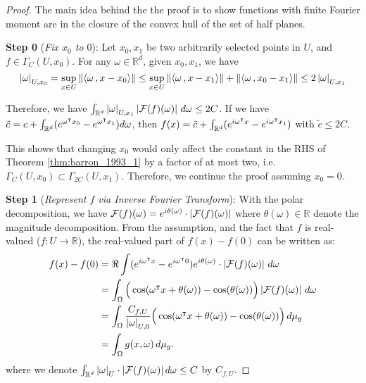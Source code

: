 \begin{proof}
    The main idea behind the the proof is to show functions with finite Fourier
    moment are in the closure of the convex hull of the set of half planes.

    \textbf{Step 0} (\textit{Fix $x_0$ to $0$}): Let $x_0, x_1$ be two
    arbitrarily selected points in $U$, and $f \in \Gamma_C(U, x_0)$.  For any
    $\omega \in \mathbb{R}^d$, given $x_0, x_1$, we have
    \begin{equation}
        \left| \omega \right|_{U, x_0} 
            = \sup_{x\in U}\left\| \left\langle \omega\, , x-x_0 \right\rangle \right\| 
            \leq \sup_{x\in U}\left\| \left\langle \omega\, , x-x_1 \right\rangle \right\| + \left\| \left\langle \omega\, , x_0-x_1 \right\rangle \right\| 
            \leq 2\left| \omega \right|_{U, x_1}
    \end{equation}

    Therefore, we have $\int_{\mathbb{R}^d} \left| \omega \right|_{U, x_1}
    \left| \mathcal{F}(f)(\omega) \right|\,d\omega \leq 2C$. If we have $\tilde{c} = c +
    \int_{\mathbb{R}^d} (e^{\omega{}^{\intercal} x_0} - e^{\omega{}^{\intercal} x_1}) d\omega$, then
    $f(x) = \tilde{c} + \int_{\mathbb{R}^d} (e^{i\omega{}^{\intercal} x} - e^{i\omega{}^{\intercal}
    x_1})$ with $\tilde{c} \leq 2C$.

    This shows that changing $x_0$ would only affect the constant in the RHS of
    Theorem \ref{thm:barron_1993_1} by a factor of at most two, i.e.
    $\Gamma_C(U, x_0) \subset \Gamma_{2C}(U, x_1)$. Therefore, we continue the
    proof assuming $x_0 = 0$.

    \textbf{Step 1} (\textit{Represent $f$ via Inverse Fourier Transform}): With
    the polar decomposition, we have $\mathcal{F}(f)(\omega) = e^{i\theta(\omega)}
    \cdot \left| \mathcal{F}(f)(\omega) \right|$ where $\theta(\omega) \in \mathbb{R}$
    denote the magnitude decomposition. From the assumption, and the fact that
    $f$ is real-valued ($f: U \to \mathbb{R}$), the real-valued part of $f(x) -
    f(0)$ can be written as:
    \begin{align}
        \label{eq:barron_fouier_int}
        f(x) - f(0)
        & = \Re \int (e^{i\omega{}^{\intercal} x} - e^{i\omega{}^{\intercal} 0}) e^{i\theta(\omega)} \cdot 
        \left| \mathcal{F}(f)(\omega) \right| \,d\omega \\
        & = \int_{\Omega}\Big(\cos(\omega{}^{\intercal} x + \theta(\omega)) - \cos(\theta(\omega))\Big)
        \left| \mathcal{F}(f)(\omega) \right| \,d\omega \\
        & = \int_{\Omega} \frac{C_{f,U}}{\left| \omega \right|_{U, 0}}\Big(\cos(\omega{}^{\intercal} x + \theta
        (\omega)) - \cos(\theta(\omega))\Big)\,d\mu_g \\
        & = \int_{\Omega} g(x, \omega)\,d\mu_g.
    \end{align}
    where we denote $\int_{\mathbb{R}^d} \left| \omega \right|_{U} \cdot
    \left| \mathcal{F}(f)(\omega) \right| d\omega \leq C$ by $C_{f, U}$.


\end{proof}
